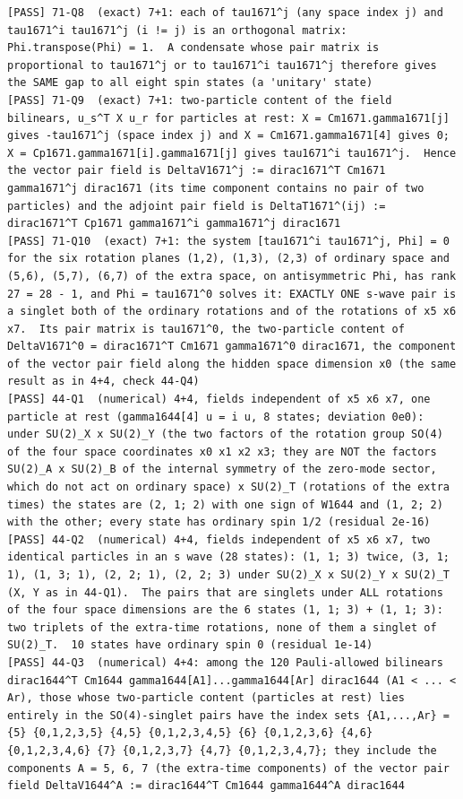 \documentclass[
  10pt,
]{article}
\begin{document}
\begin{verbatim}
[PASS] 71-Q8  (exact) 7+1: each of tau1671^j (any space index j) and tau1671^i tau1671^j (i != j) is an orthogonal matrix: Phi.transpose(Phi) = 1.  A condensate whose pair matrix is proportional to tau1671^j or to tau1671^i tau1671^j therefore gives the SAME gap to all eight spin states (a 'unitary' state)
[PASS] 71-Q9  (exact) 7+1: two-particle content of the field bilinears, u_s^T X u_r for particles at rest: X = Cm1671.gamma1671[j] gives -tau1671^j (space index j) and X = Cm1671.gamma1671[4] gives 0; X = Cp1671.gamma1671[i].gamma1671[j] gives tau1671^i tau1671^j.  Hence the vector pair field is DeltaV1671^j := dirac1671^T Cm1671 gamma1671^j dirac1671 (its time component contains no pair of two particles) and the adjoint pair field is DeltaT1671^(ij) := dirac1671^T Cp1671 gamma1671^i gamma1671^j dirac1671
[PASS] 71-Q10  (exact) 7+1: the system [tau1671^i tau1671^j, Phi] = 0 for the six rotation planes (1,2), (1,3), (2,3) of ordinary space and (5,6), (5,7), (6,7) of the extra space, on antisymmetric Phi, has rank 27 = 28 - 1, and Phi = tau1671^0 solves it: EXACTLY ONE s-wave pair is a singlet both of the ordinary rotations and of the rotations of x5 x6 x7.  Its pair matrix is tau1671^0, the two-particle content of DeltaV1671^0 = dirac1671^T Cm1671 gamma1671^0 dirac1671, the component of the vector pair field along the hidden space dimension x0 (the same result as in 4+4, check 44-Q4)
[PASS] 44-Q1  (numerical) 4+4, fields independent of x5 x6 x7, one particle at rest (gamma1644[4] u = i u, 8 states; deviation 0e0): under SU(2)_X x SU(2)_Y (the two factors of the rotation group SO(4) of the four space coordinates x0 x1 x2 x3; they are NOT the factors SU(2)_A x SU(2)_B of the internal symmetry of the zero-mode sector, which do not act on ordinary space) x SU(2)_T (rotations of the extra times) the states are (2, 1; 2) with one sign of W1644 and (1, 2; 2) with the other; every state has ordinary spin 1/2 (residual 2e-16)
[PASS] 44-Q2  (numerical) 4+4, fields independent of x5 x6 x7, two identical particles in an s wave (28 states): (1, 1; 3) twice, (3, 1; 1), (1, 3; 1), (2, 2; 1), (2, 2; 3) under SU(2)_X x SU(2)_Y x SU(2)_T (X, Y as in 44-Q1).  The pairs that are singlets under ALL rotations of the four space dimensions are the 6 states (1, 1; 3) + (1, 1; 3): two triplets of the extra-time rotations, none of them a singlet of SU(2)_T.  10 states have ordinary spin 0 (residual 1e-14)
[PASS] 44-Q3  (numerical) 4+4: among the 120 Pauli-allowed bilinears dirac1644^T Cm1644 gamma1644[A1]...gamma1644[Ar] dirac1644 (A1 < ... < Ar), those whose two-particle content (particles at rest) lies entirely in the SO(4)-singlet pairs have the index sets {A1,...,Ar} = {5} {0,1,2,3,5} {4,5} {0,1,2,3,4,5} {6} {0,1,2,3,6} {4,6} {0,1,2,3,4,6} {7} {0,1,2,3,7} {4,7} {0,1,2,3,4,7}; they include the components A = 5, 6, 7 (the extra-time components) of the vector pair field DeltaV1644^A := dirac1644^T Cm1644 gamma1644^A dirac1644

\end{verbatim}
\end{document}

